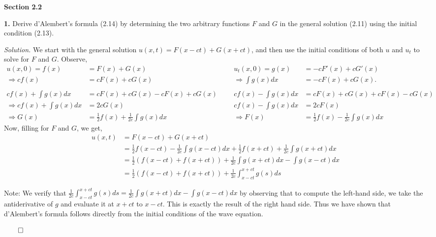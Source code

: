 \documentclass{article}
\begin{document}
\vspace{5mm}

\newpage

\textbf{Section 2.2}

\textbf{1.} Derive d'Alembert's formula (2.14) by determining the two arbitrary functions \(F\) and \(G\) in the general solution (2.11) using  the initial condition (2.13). 

\vspace{3mm}
\textit{Solution.} We start with the general solution \( u(x,t) = F(x-ct) + G(x+ct) \), and then use the initial conditions of both \(u\) and \(u_t\) to solve for \(F\) and \(G\). Observe, 
\begin{align*}
  u(x,0)=f(x) &=F(x) + G(x)    &     &      &   u_t(x,0)=g(x) &= -c F'(x) + c G'(x) \\
  \Rightarrow cf(x) &= cF(x) + cG(x)  & & &  \Rightarrow \int g(x)dx &= -cF(x) + cG(x). \\
   &&&&&\\
   cf(x) + \int g(x) dx &= cF(x) + cG(x) -cF(x) + cG(x) &&&     cf(x) - \int g(x) dx &= cF(x) + cG(x) +cF(x) -cG(x)  \\
   \Rightarrow cf(x) + \int g(x) dx &= 2cG(x) &&&  cf(x) - \int g(x) dx &= 2cF(x)  \\
   \Rightarrow G(x) &= \frac{1}{2} f(x) + \frac{1}{2c} \int g(x)dx &&& \Rightarrow F(x)  &= \frac{1}{2}f(x) - \frac{1}{2c}\int g(x) dx
\end{align*}
Now, filling for \(F\) and \(G\), we get, 
\begin{align*}
u(x,t) &= F(x-ct) + G(x+ct) \\ 
&= \frac{1}{2}f(x-ct) - \frac{1}{2c} \int g(x-ct) dx + \frac{1}{2} f(x+ct) + \frac{1}{2c} \int g(x+ct)dx\\
&= \frac{1}{2}( f(x-ct) + f(x+ct) ) + \frac{1}{2c}  \int g(x+ct)dx- \int g(x-ct)dx \\
&= \frac{1}{2}( f(x-ct) + f(x+ct) ) + \frac{1}{2c}  \int_{x-ct}^{x+ct} g(s) ds
\end{align*}

Note: We verify that \(\frac{1}{2c}\int_{x-ct}^{x+ct} g(s) ds=  \frac{1}{2c}  \int g(x+ct)dx- \int g(x-ct)dx  \) by observing that to compute the left-hand side, we take the antiderivative of \(g\) and evaluate it at \( x+ct \) to \(x-ct\). This is exactly the result of the right hand side. Thus we have shown that d'Alembert's formula follows directly from the initial conditions of the wave equation. 
\begin{flushright}
\( \qed\)
\end{flushright}
\end{document}
